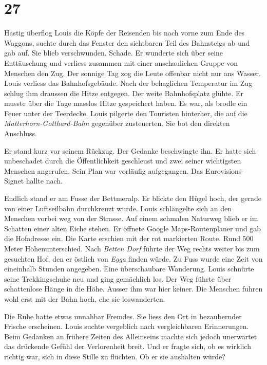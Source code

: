 \chapter{27}




Hastig überflog Louis die Köpfe der Reisenden bis nach vorne zum Ende
des Waggons, suchte durch das Fenster den sichtbaren Teil des
Bahnsteigs ab und gab auf. Sie blieb verschwunden. Schade. Er wunderte
sich über seine Enttäuschung und verliess zusammen mit einer
anschaulichen Gruppe von Menschen den Zug.
Der sonnige Tag zog die Leute offenbar nicht nur ans
Wasser.
Louis verliess das Bahnhofsgebäude. Nach der behaglichen Temperatur im Zug
schlug ihm draussen die Hitze entgegen. Der weite Bahnhofsplatz glühte. Er musste über die Tage masslos Hitze gespeichert
haben. Es war, als brodle ein Feuer unter der Teerdecke.
Louis pilgerte den Touristen hinterher, die auf die
\emph{Matterhorn-Gotthard-Bahn} gegenüber zusteuerten. Sie bot den
direkten Anschluss.

Er stand kurz vor seinem Rückzug. Der Gedanke beschwingte ihn. Er hatte
sich unbeschadet durch die Öffentlichkeit geschleust und zwei seiner
wichtigsten Menschen angerufen. Sein Plan war vorläufig aufgegangen. Das
Eurovisions-Signet hallte nach.

\sectionbreak

Endlich stand er am Fusse der Bettmeralp. Er blickte den Hügel hoch, der
gerade von einer Luftseilbahn durchkreuzt wurde.
Louis schlängelte sich an den Menschen vorbei weg von der
Strasse. Auf einem schmalen Naturweg blieb er im Schatten einer alten
Eiche stehen. Er öffnete Google Maps-Routenplaner und gab die Hofadresse
ein. Die Karte erschien mit der rot markierten Route. Rund 500 Meter
Höhenunterschied. Nach \emph{Betten Dorf} führte der Weg rechts weiter bis zum gesuchten Hof, den er östlich von
\emph{Egga} finden würde. Zu Fuss wurde eine Zeit von eineinhalb Stunden
angegeben. Eine überschaubare Wanderung.
Louis schnürte seine Trekkingschuhe neu und ging gemächlich los. Der Weg
führte über schattenlose Hänge in die Höhe. Ausser ihm war hier keiner.
Die Menschen fuhren wohl erst mit der Bahn hoch, ehe sie loswanderten.

Die Ruhe hatte etwas unnahbar Fremdes. Sie liess den Ort in bezaubernder
Frische erscheinen. Louis suchte vergeblich nach vergleichbaren Erinnerungen.
Beim Gedanken an frühere Zeiten des Alleinseins machte sich jedoch
unerwartet das drückende Gefühl der Verlorenheit breit. Und er fragte
sich, ob es wirklich richtig war, sich in diese Stille zu flüchten. Ob er sie aushalten würde?

